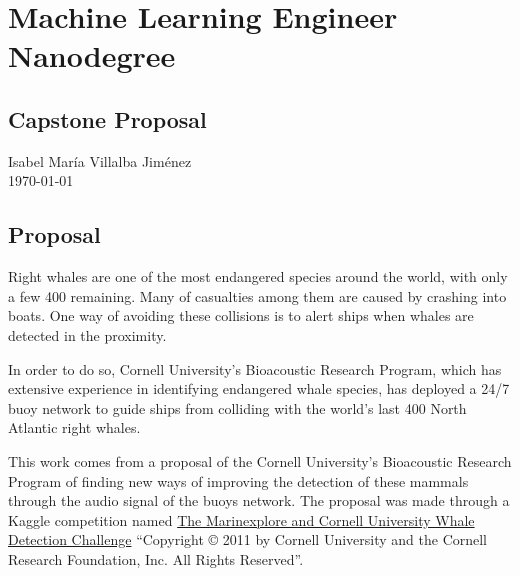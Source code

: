 \documentclass[]{article}
\author{}
\date{}
\newcommand{\competition}{The Marinexplore and Cornell University Whale Detection Challenge}
\newcommand{\copyrighting}{“Copyright © 2011 by Cornell University and the Cornell Research Foundation, Inc. All Rights Reserved”}
\begin{document}
\section{Machine Learning Engineer
Nanodegree}\label{machine-learning-engineer-nanodegree}

\subsection{Capstone Proposal}\label{capstone-proposal}

Isabel María Villalba Jiménez \\ \today

\subsection{Proposal}\label{proposal}


Right whales are one of the most endangered species around the world, with only a few 400 remaining. Many of casualties among them are caused by crashing into boats. One way of avoiding these collisions is to alert ships when whales are detected in the proximity.

In order to do so, Cornell University's Bioacoustic Research Program, which has extensive experience in identifying endangered whale species, has deployed a 24/7 buoy network to guide ships from colliding with the world's last 400 North Atlantic right whales.

This work comes from a proposal of the Cornell University's Bioacoustic Research Program of finding new ways of improving the detection of these mammals through the audio signal of the buoys network. The proposal was made through a Kaggle competition named \href{https://www.kaggle.com/c/whale-detection-challenge}{\competition} \cite{kagglewhale} \copyrighting.
\end{document}
